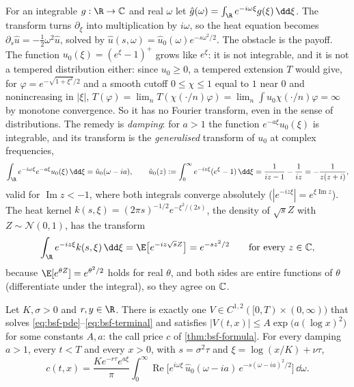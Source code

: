 For an integrable $g:\R\to\C$ and real $\omega$ let $\hat g(\omega)=\int_\R e^{-i\omega\xi}g(\xi)\,\dd\xi$.
The transform turns $\partial_\xi$ into multiplication by $i\omega$, so the heat equation becomes
$\partial_s\hat u=-\frac12\omega^2\hat u$, solved by $\hat u(s,\omega)=\hat u_0(\omega)e^{-s\omega^2/2}$.
The obstacle is the payoff. The function $u_0(\xi)=(e^\xi-1)^+$ grows like $e^\xi$: it is not integrable,
and it is not a tempered distribution either: since $u_0\ge0$, a tempered extension $T$ would give, for
$\varphi=e^{-\sqrt{1+\xi^2}/2}$ and a smooth cutoff $0\le\chi\le1$ equal to $1$ near $0$ and nonincreasing in $|\xi|$,
$T(\varphi)=\lim_nT(\chi(\cdot/n)\varphi)=\lim_n\int u_0\chi(\cdot/n)\varphi=\infty$ by monotone convergence. So it has no
Fourier transform, even in the sense of distributions. The remedy is \emph{damping}: for $a>1$ the function $e^{-a\xi}u_0(\xi)$
is integrable, and its transform is the \emph{generalised} transform of $u_0$ at complex frequencies,
\begin{equation}\label{eq:bsf-payoff-transform}
  \int_\R e^{-i\omega\xi}e^{-a\xi}u_0(\xi)\,\dd\xi=\hat u_0(\omega-ia),\qquad
  \hat u_0(z):=\int_0^\infty e^{-iz\xi}(e^\xi-1)\,\dd\xi=\frac{1}{iz-1}-\frac{1}{iz}=-\frac{1}{z(z+i)},
\end{equation}
valid for $\operatorname{Im}z<-1$, where both integrals converge absolutely ($|e^{-iz\xi}|=e^{\xi\operatorname{Im}z}$).
The heat kernel $k(s,\xi)=(2\pi s)^{-1/2}e^{-\xi^2/(2s)}$, the density of $\sqrt sZ$ with
$Z\sim\mathcal N(0,1)$, has the transform
\begin{equation}\label{eq:bsf-kernel-transform}
  \int_\R e^{-iz\xi}k(s,\xi)\,\dd\xi=\E\big[e^{-iz\sqrt sZ}\big]=e^{-sz^2/2}\qquad\text{for every }z\in\C,
\end{equation}
because $\E[e^{\theta Z}]=e^{\theta^2/2}$ holds for real $\theta$, and both sides are entire functions of
$\theta$ (differentiate under the integral), so they agree on $\mathbb{C}$.

\begin{proposition}\label{prop:bsf-pde}
Let $K,\sigma>0$ and $r,y\in\R$. There is exactly one $V\in C^{1,2}([0,T)\times(0,\infty))$ that solves
\eqref{eq:bsf-pde}--\eqref{eq:bsf-terminal} and satisfies $|V(t,x)|\le A\exp\big(a(\log x)^2\big)$ for some
constants $A,a$: the call price $c$ of \cref{thm:bsf-formula}. For every damping $a>1$, every $t<T$ and
every $x>0$, with $s=\sigma^2\tau$ and $\xi=\log(x/K)+\nu\tau$,
\begin{equation}\label{eq:bsf-fourier}
  c(t,x)=\frac{Ke^{-r\tau}e^{a\xi}}{\pi}\int_0^\infty\operatorname{Re}\Big[e^{i\omega\xi}\,\hat u_0(\omega-ia)\,
  e^{-s(\omega-ia)^2/2}\Big]\,\dd\omega .
\end{equation}
\end{proposition}

